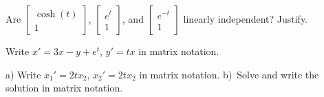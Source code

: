 \documentclass[12pt]{book}
\begin{document}
\begin{exercise}
Are
$\left[ \begin{smallmatrix}
\cosh(t) \\ 1
\end{smallmatrix}\right]$,
$\left[ \begin{smallmatrix}
e^{t} \\ 1
\end{smallmatrix}\right]$,
and
$\left[ \begin{smallmatrix}
e^{-t} \\ 1
\end{smallmatrix}\right]$
linearly independent?  Justify.
\end{exercise}

\begin{exercise}
Write $x'=3x-y+e^t$, $y'=tx$ in matrix notation.
\end{exercise}

\begin{exercise}
a) Write $x_1'=2tx_2$, $x_2'=2tx_2$ in matrix notation.  b)~Solve and write
the solution in matrix notation.
\end{exercise}
\end{document}
